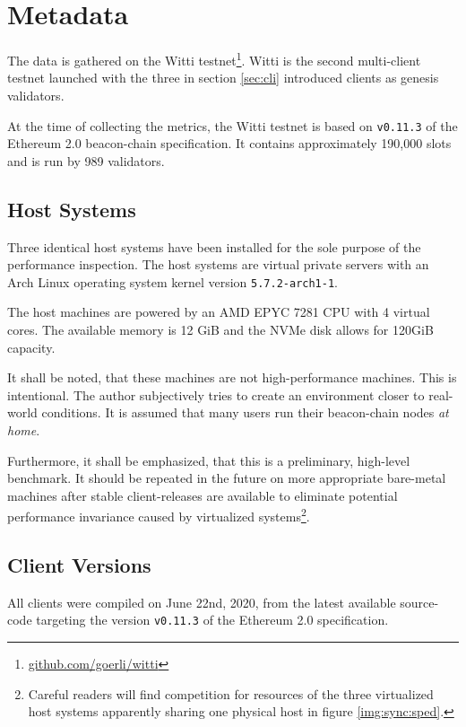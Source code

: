 \documentclass[twoside,twocolumn]{article}
\begin{document}
\section{Metadata}
The data is gathered on the Witti testnet\footnote{\href{https://github.com/goerli/witti}{github.com/goerli/witti}}. Witti is the second multi-client testnet launched with the three in section \ref{sec:cli} introduced clients as genesis validators.\par

At the time of collecting the metrics, the Witti testnet is based on \texttt{v0.11.3} of the Ethereum 2.0 beacon-chain specification. It contains approximately 190,000 slots and is run by 989 validators.\par

\subsection{Host Systems}
Three identical host systems have been installed for the sole purpose of the performance inspection. The host systems are virtual private servers with an Arch Linux operating system kernel version \texttt{5.7.2-arch1-1}.\par

The host machines are powered by an AMD EPYC 7281 CPU with 4 virtual cores. The available memory is 12 GiB and the NVMe disk allows for 120GiB capacity.\par

It shall be noted, that these machines are not high-performance machines. This is intentional. The author subjectively tries to create an environment closer to real-world conditions. It is assumed that many users run their beacon-chain nodes \textit{at home}.\par

Furthermore, it shall be emphasized, that this is a preliminary, high-level benchmark. It should be repeated in the future on more appropriate bare-metal machines after stable client-releases are available to eliminate potential performance invariance caused by virtualized systems\footnote{Careful readers will find competition for resources of the three virtualized host systems apparently sharing one physical host in figure \ref{img:sync:sped}.}.\par

\subsection{Client Versions}
All clients were compiled on June 22nd, 2020, from the latest available source-code targeting the version \texttt{v0.11.3} of the Ethereum 2.0 specification.
\end{document}
